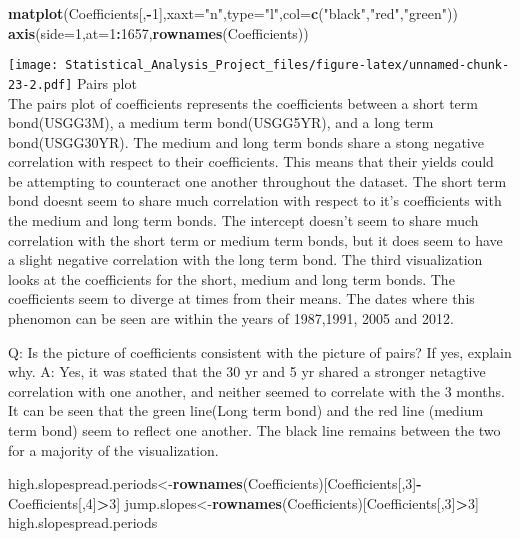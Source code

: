 \documentclass[]{article}
\newenvironment{Shaded}{\begin{snugshade}}{\end{snugshade}}
\newcommand{\KeywordTok}[1]{\textcolor[rgb]{0.13,0.29,0.53}{\textbf{#1}}}
\newcommand{\DataTypeTok}[1]{\textcolor[rgb]{0.13,0.29,0.53}{#1}}
\newcommand{\DecValTok}[1]{\textcolor[rgb]{0.00,0.00,0.81}{#1}}
\newcommand{\StringTok}[1]{\textcolor[rgb]{0.31,0.60,0.02}{#1}}
\newcommand{\OperatorTok}[1]{\textcolor[rgb]{0.81,0.36,0.00}{\textbf{#1}}}
\newcommand{\NormalTok}[1]{#1}
\begin{document}
\begin{Shaded}
\begin{Highlighting}[]
\KeywordTok{matplot}\NormalTok{(Coefficients[,}\OperatorTok{-}\DecValTok{1}\NormalTok{],}\DataTypeTok{xaxt=}\StringTok{"n"}\NormalTok{,}\DataTypeTok{type=}\StringTok{"l"}\NormalTok{,}\DataTypeTok{col=}\KeywordTok{c}\NormalTok{(}\StringTok{"black"}\NormalTok{,}\StringTok{"red"}\NormalTok{,}\StringTok{"green"}\NormalTok{))}
\KeywordTok{axis}\NormalTok{(}\DataTypeTok{side=}\DecValTok{1}\NormalTok{,}\DataTypeTok{at=}\DecValTok{1}\OperatorTok{:}\DecValTok{1657}\NormalTok{,}\KeywordTok{rownames}\NormalTok{(Coefficients))}
\end{Highlighting}
\end{Shaded}

\texttt{[image: Statistical\_Analysis\_Project\_files/figure-latex/unnamed-chunk-23-2.pdf]}
Pairs plot\\
The pairs plot of coefficients represents the coefficients between a
short term bond(USGG3M), a medium term bond(USGG5YR), and a long term
bond(USGG30YR). The medium and long term bonds share a stong negative
correlation with respect to their coefficients. This means that their
yields could be attempting to counteract one another throughout the
dataset. The short term bond doesnt seem to share much correlation with
respect to it's coefficients with the medium and long term bonds. The
intercept doesn't seem to share much correlation with the short term or
medium term bonds, but it does seem to have a slight negative
correlation with the long term bond. The third visualization looks at
the coefficients for the short, medium and long term bonds. The
coefficients seem to diverge at times from their means. The dates where
this phenomon can be seen are within the years of 1987,1991, 2005 and
2012.

Q: Is the picture of coefficients consistent with the picture of pairs?
If yes, explain why. A: Yes, it was stated that the 30 yr and 5 yr
shared a stronger netagtive correlation with one another, and neither
seemed to correlate with the 3 months. It can be seen that the green
line(Long term bond) and the red line (medium term bond) seem to reflect
one another. The black line remains between the two for a majority of
the visualization.

\begin{Shaded}
\begin{Highlighting}[]
\NormalTok{high.slopespread.periods<-}\KeywordTok{rownames}\NormalTok{(Coefficients)[Coefficients[,}\DecValTok{3}\NormalTok{]}\OperatorTok{-}\NormalTok{Coefficients[,}\DecValTok{4}\NormalTok{]}\OperatorTok{>}\DecValTok{3}\NormalTok{]}
\NormalTok{jump.slopes<-}\KeywordTok{rownames}\NormalTok{(Coefficients)[Coefficients[,}\DecValTok{3}\NormalTok{]}\OperatorTok{>}\DecValTok{3}\NormalTok{]}
\NormalTok{high.slopespread.periods}
\end{Highlighting}
\end{Shaded}
\end{document}
